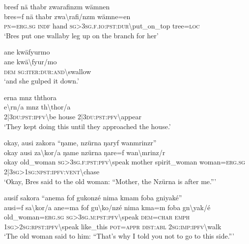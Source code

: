\ea\label{ex:8:a1761}
bresf nä thabr zwarafinzm wämnen\\
\gll bres=f	nä	thabr	zwa{\textbackslash}rafi/nzm	wämne=en\\
     \textsc{pn}=\textsc{erg}.\textsc{sg}	\textsc{indf}	hand	\textsc{sg}>3\textsc{sg}.\textsc{f}.\textsc{io}:\textsc{pst}:\textsc{dur}{\textbackslash}put\_on\_top	tree=\textsc{loc}\\
\glt `Bres put one wallaby leg up on the branch for her'
\z

\ea\label{ex:8:a1762}
ane kwäfyurmo\\
\gll ane	kwä{\textbackslash}fyur/mo\\
     \textsc{dem}	\textsc{sg}:\textsc{iter}:\textsc{dur}:\textsc{and}{\textbackslash}swallow\\
\glt `and she gulped it down.'
\z

\ea\label{ex:8:a1763}
erna mnz ththora\\
\gll e{\textbackslash}rn/a	mnz	th{\textbackslash}thor/a\\
     2|3\textsc{du}:\textsc{pst}:\textsc{ipfv}{\textbackslash}be	house	2|3\textsc{du}:\textsc{pst}:\textsc{pfv}{\textbackslash}appear\\
\glt `They kept doing this until they approached the house.'
\z

\ea\label{ex:8:a1765}
okay, ausi zakora ``ŋame, nzürna ŋaryf wanmrinzr''\\
\gll okay	ausi	za{\textbackslash}kor/a	ŋame	nzürna	ŋare=f	wan{\textbackslash}mrinz/r\\
     okay	old\_woman	\textsc{sg}>3\textsc{sg}.\textsc{f}:\textsc{pst}:\textsc{pfv}{\textbackslash}speak	mother	spirit\_woman	woman=\textsc{erg}.\textsc{sg}	2|3\textsc{sg}>1\textsc{sg}:\textsc{npst}:\textsc{ipfv}:\textsc{vent}{\textbackslash}chase\\
\glt `Okay, Bres said to the old woman: ``Mother, the Nzürna is after me.'''
\z

\ea\label{ex:8:a1766}
ausif sakora ``anema fof gukonzé nima kmam foba gniyaké''\\
\gll ausi=f	sa{\textbackslash}kor/a	ane=ma	fof	gu{\textbackslash}ko/nzé	nima	kma=m	foba	gn{\textbackslash}yak/é\\
     old\_woman=\textsc{erg}.\textsc{sg}	\textsc{sg}>3\textsc{sg}.\textsc{m}:\textsc{pst}:\textsc{pfv}{\textbackslash}speak	\textsc{dem}=\textsc{char}	\textsc{emph}	1\textsc{sg}>2\textsc{sg}:\textsc{rpst}:\textsc{ipfv}{\textbackslash}speak	like\_this	\textsc{pot}=\textsc{appr}	\textsc{dist}:\textsc{abl}	2\textsc{sg}:\textsc{imp}:\textsc{ipfv}{\textbackslash}walk\\
\glt `The old woman said to him: ``That's why I told you not to go to this side.'''
\z

